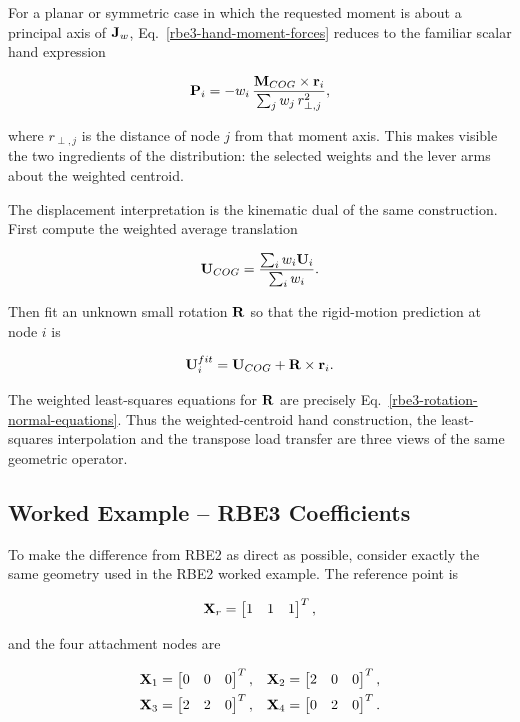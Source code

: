 For a planar or symmetric case in which the requested moment is about a principal
axis of $\mathbf{J}_w$, Eq.~\eqref{rbe3-hand-moment-forces} reduces to the familiar
scalar hand expression

\begin{equation}
    \mathbf{P}_i
    =-w_i\,
      \frac{\mathbf{M}_{COG}\times\mathbf{r}_i}
      {\sum_jw_j\,r_{\perp,j}^{2}},
\end{equation}

where $r_{\perp,j}$ is the distance of node $j$ from that moment axis. This makes
visible the two ingredients of the distribution: the selected weights and the
lever arms about the weighted centroid.

The displacement interpretation is the kinematic dual of the same construction.
First compute the weighted average translation

\begin{equation}
    \mathbf{U}_{COG}=\frac{\sum_iw_i\mathbf{U}_i}{\sum_iw_i}.
\end{equation}

Then fit an unknown small rotation $\mathbf{R}$ so that the rigid-motion prediction at
node $i$ is

\begin{equation}
    \mathbf{U}^{fit}_i=\mathbf{U}_{COG}+\mathbf{R}\times\mathbf{r}_i.
\end{equation}

The weighted least-squares equations for $\mathbf{R}$ are precisely
Eq.~\eqref{rbe3-rotation-normal-equations}. Thus the weighted-centroid hand
construction, the least-squares interpolation and the transpose load transfer
are three views of the same geometric operator.

\subsection{Worked Example -- RBE3 Coefficients}

To make the difference from RBE2 as direct as possible, consider exactly the
same geometry used in the RBE2 worked example. The reference point is

\begin{equation}
    \mathbf{X}_r=\begin{bmatrix}1&1&1\end{bmatrix}^{T},
\end{equation}

and the four attachment nodes are

\begin{equation}
\begin{aligned}
    \mathbf{X}_1&=\begin{bmatrix}0&0&0\end{bmatrix}^{T}, &
    \mathbf{X}_2&=\begin{bmatrix}2&0&0\end{bmatrix}^{T},\\
    \mathbf{X}_3&=\begin{bmatrix}2&2&0\end{bmatrix}^{T}, &
    \mathbf{X}_4&=\begin{bmatrix}0&2&0\end{bmatrix}^{T}.
\end{aligned}
\end{equation}

